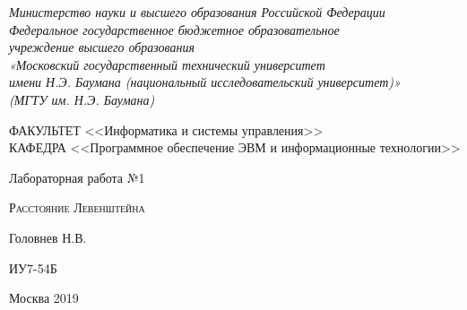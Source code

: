 \begin{titlepage}
\newpage

\begin{center}

\textit{Министерство науки и высшего образования Российской Федерации \\ 
Федеральное государственное бюджетное образовательное \\
учреждение высшего образования \\
«Московский государственный технический университет \\
имени Н.Э. Баумана (национальный исследовательский университет)» \\
(МГТУ им. Н.Э. Баумана) \\}
\hrulefill
\end{center}

\vspace{2em}

\begin{flushleft}
ФАКУЛЬТЕТ <<Информатика и системы управления>> \\
\vspace{0.5em}
КАФЕДРА <<Программное обеспечение ЭВМ и информационные технологии>>
\end{flushleft}


\vspace{8em}

\begin{center}
\LARGE Лабораторная работа №1 \\
\end{center}

\vspace{1.5em}

\begin{center}
\textsc{Расстояние Левенштейна}
\end{center}

\vspace{6em}

\begin{center}
Головнев Н.В.

\vspace{4em}

ИУ7-54Б
\end{center}

\vspace{\fill}

\begin{center}
Москва 2019
\end{center}

\end{titlepage}
